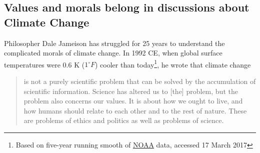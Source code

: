 \subsection{Values and morals belong in discussions about Climate Change}\label{values_morals}
Philosopher Dale Jameison has struggled for 25 years to understand the complicated morals of climate change. In 1992 CE, when global surface temperatures were 0.6 K ($1^\circ F$) cooler than today\footnote{Based on five-year running smooth of \href{https://www.ncdc.noaa.gov/cag/time-series/global/globe/land_ocean/ytd/12/1880-2016.csv}{NOAA} data, accessed 17 March 2017}, he wrote that climate change 
\begin{quotation}
is not a purely scientific problem that can be solved by the accumulation of scientific information. Science has altered us to [the] problem, but the problem also concerns our values. It is about how we ought to live, and how humans should relate to each other and to the rest of nature. These are problems of ethics and politics as well as problems of science.
\end{quotation}
